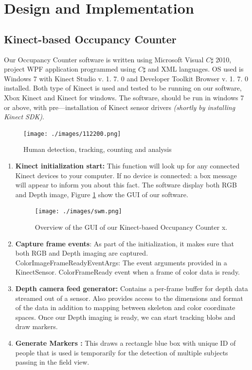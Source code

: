 \section{Design and Implementation}
\label{sec:design}


\subsection{Kinect-based Occupancy Counter }
Our  Occupancy Counter software is written using Microsoft Visual $C\sharp$ 2010,  project WPF application programmed using $C\sharp$ and XML languages.  OS used is Windows 7 with Kinect Studio v. 1. 7. 0 and Developer Toolkit Browser v. 1. 7. 0 installed.  Both type of Kinect is used and tested to be running on our software,  Xbox Kinect and Kinect for windows.  The software,  should be run in windows 7 or above,  with pre---installation of Kinect sensor drivers \emph{(shortly by installing Kinect SDK)}.

 \begin{figure}[!ht]
  \begin{center}
	  	\texttt{[image: ./images/112200.png]}
  \end{center}
  \caption{Human detection,  tracking, counting and analysis}
\end{figure}

\begin{enumerate}
  \item \textbf{Kinect initialization start:} This function will look up for any connected Kinect devices to your computer.  If no device is connected: a box message will appear to inform you about this fact.  The software display both RGB and Depth image,  Figure \ref{fig:guioverview} show the GUI of our software.

     \begin{figure}[!ht]
  \begin{center}
	  	\texttt{[image: ./images/swm.png]}
  \end{center}
  \caption{Overview of the GUI of our Kinect-based Occupancy Counter x.}
  \label{fig:guioverview}
\end{figure}
\item \textbf{Capture frame events}: As part of the initialization,  it makes sure that both RGB and Depth imaging are captured.
ColorImageFrameReadyEventArgs:	The event arguments provided in a KinectSensor. ColorFrameReady event when a frame of color data is ready.
\item \textbf{Depth camera feed generator:} Contains a per-frame buffer for depth data streamed out of a sensor.  Also provides access to the dimensions and format of the data in addition to mapping between skeleton and color coordinate spaces.  Once our Depth imaging is ready, we can start tracking blobs and draw markers.
\item \textbf{Generate Markers :} This draws a rectangle blue box  with unique ID of people that is used is temporarily  for the detection of multiple subjects passing in the field view.

\end{enumerate}



